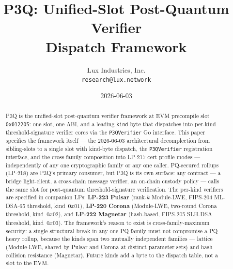 \documentclass[11pt,a4paper]{article}
\title{P3Q: Unified-Slot Post-Quantum Verifier\\
       Dispatch Framework}
\author{Lux Industries, Inc. \\
        \texttt{research@lux.network}}
\date{2026-06-03}
\begin{document}
\luxcoverpage

\begin{abstract}
P3Q is the unified-slot post-quantum verifier framework at EVM
precompile slot \texttt{0x012205}: one slot, one ABI, and a
leading \texttt{kind} byte that dispatches into per-kind
threshold-signature verifier cores via the \texttt{P3QVerifier}
Go interface. This paper specifies the framework itself --- the
2026-06-03 architectural decomplection from sibling-slots to a
single slot with kind-byte dispatch, the \texttt{P3QVerifier}
registration interface, and the cross-family composition into
LP-217 cert profile modes --- independently of any one
cryptographic family or any one caller. PQ-secured rollups
(LP-218) are P3Q's primary consumer, but P3Q is its own surface:
any contract --- a bridge light-client, a cross-chain message
verifier, an on-chain custody policy --- calls the same slot for
post-quantum threshold-signature verification. The per-kind
verifiers are specified in
companion LPs: \textbf{LP-223 Pulsar} (rank-$k$ Module-LWE,
FIPS-204 ML-DSA-65 threshold, kind~$0x01$), \textbf{LP-220
Corona} (Module-LWE, two-round Corona threshold, kind~$0x02$),
and \textbf{LP-222 Magnetar} (hash-based, FIPS-205 SLH-DSA
threshold, kind~$0x03$). The framework's reason to exist is
cross-family-maximum security: a single structural break in any
one PQ family must not compromise a PQ-heavy rollup, because the
kinds span two mutually independent families --- lattice
(Module-LWE, shared by Pulsar and Corona at distinct parameter
sets) and hash collision resistance (Magnetar). Future kinds
add a byte to the dispatch table, not a slot to the EVM.
\end{abstract}

\tableofcontents
\newpage








\end{document}
